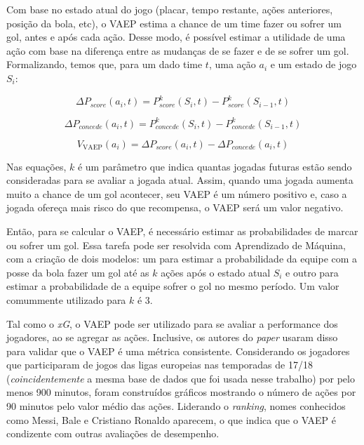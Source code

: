 \documentclass{article}
\begin{document}
Com base no estado atual do jogo (placar, tempo restante, ações anteriores,
posição da bola, etc), o VAEP estima a chance de um time fazer ou sofrer um gol,
antes e após cada ação. Desse modo, é possível estimar a utilidade de uma ação
com base na diferença entre as mudanças de se fazer e de se sofrer um gol.
Formalizando, temos que, para um dado time $t$, uma ação $a_i$ e um estado de
jogo $S_i$:

\begin{equation}
	\Delta P_{score}(a_i,t) = P^k_{score}(S_i,t) - P^k_{score}(S_{i-1},t)
	\label{eq:vaep_scores}
\end{equation}

\begin{equation}
	\Delta P_{concede}(a_i,t) = P^k_{concede}(S_i,t) - P^k_{concede}(S_{i-1},t)
	\label{eq:vaep_concedes}
\end{equation}

\begin{equation}
	V_{\textrm{VAEP}}(a_i) = \Delta P_{score}(a_i,t) - \Delta P_{concede}(a_i,t) 
	\label{eq:vaep}
\end{equation}

Nas equações, $k$ é um parâmetro que indica quantas jogadas futuras estão sendo
consideradas para se avaliar a jogada atual. Assim, quando uma jogada aumenta
muito a chance de um gol acontecer, seu VAEP é um número positivo e, caso a
jogada ofereça mais risco do que recompensa, o VAEP será um valor negativo.

Então, para se calcular o VAEP, é necessário estimar as probabilidades de marcar
ou sofrer um gol. Essa tarefa pode ser resolvida com Aprendizado de Máquina, com
a criação de dois modelos: um para estimar a probabilidade da equipe com a posse
da bola fazer um gol até as $k$ ações após o estado atual $S_i$ e outro para
estimar a probabilidade de a equipe sofrer o gol no mesmo período. Um valor
comummente utilizado para $k$ é 3.

Tal como o \textit{xG}, o VAEP pode ser utilizado para se avaliar a performance
dos jogadores, ao se agregar as ações. Inclusive, os autores do \textit{paper}
usaram disso para validar que o VAEP é uma métrica consistente. Considerando os
jogadores que participaram de jogos das ligas europeias nas temporadas de 17/18
(\textit{coincidentemente} a mesma base de dados que foi usada nesse trabalho)
por pelo menos 900 minutos, foram construídos gráficos mostrando o número de
ações por 90 minutos pelo valor médio das ações. Liderando o \textit{ranking},
nomes conhecidos como Messi, Bale e Cristiano Ronaldo aparecem, o que indica que
o VAEP é condizente com outras avaliações de desempenho.
\end{document}
